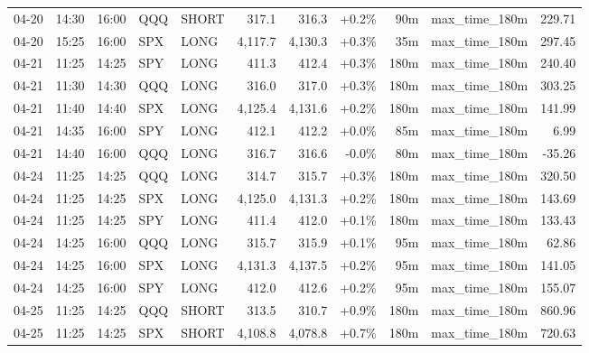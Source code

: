 \documentclass[11pt,a4paper,twoside]{article}
\begin{document}
\begin{center}
\begin{longtable}{>{\color{txtmain}}l l l l l r r r r >{\color{txtmain}}l r}
04-20 & 14:30 & 16:00 & QQQ & SHORT & 317.1 & 316.3 & \textcolor{wingreen}{+0.2\%} & 90m & max\_time\_180m & \textcolor{wingreen}{229.71} \\
04-20 & 15:25 & 16:00 & SPX & LONG & 4,117.7 & 4,130.3 & \textcolor{wingreen}{+0.3\%} & 35m & max\_time\_180m & \textcolor{wingreen}{297.45} \\
04-21 & 11:25 & 14:25 & SPY & LONG & 411.3 & 412.4 & \textcolor{wingreen}{+0.3\%} & 180m & max\_time\_180m & \textcolor{wingreen}{240.40} \\
04-21 & 11:30 & 14:30 & QQQ & LONG & 316.0 & 317.0 & \textcolor{wingreen}{+0.3\%} & 180m & max\_time\_180m & \textcolor{wingreen}{303.25} \\
04-21 & 11:40 & 14:40 & SPX & LONG & 4,125.4 & 4,131.6 & \textcolor{wingreen}{+0.2\%} & 180m & max\_time\_180m & \textcolor{wingreen}{141.99} \\
04-21 & 14:35 & 16:00 & SPY & LONG & 412.1 & 412.2 & \textcolor{wingreen}{+0.0\%} & 85m & max\_time\_180m & \textcolor{wingreen}{6.99} \\
04-21 & 14:40 & 16:00 & QQQ & LONG & 316.7 & 316.6 & \textcolor{lossred}{-0.0\%} & 80m & max\_time\_180m & \textcolor{lossred}{-35.26} \\
04-24 & 11:25 & 14:25 & QQQ & LONG & 314.7 & 315.7 & \textcolor{wingreen}{+0.3\%} & 180m & max\_time\_180m & \textcolor{wingreen}{320.50} \\
04-24 & 11:25 & 14:25 & SPX & LONG & 4,125.0 & 4,131.3 & \textcolor{wingreen}{+0.2\%} & 180m & max\_time\_180m & \textcolor{wingreen}{143.69} \\
04-24 & 11:25 & 14:25 & SPY & LONG & 411.4 & 412.0 & \textcolor{wingreen}{+0.1\%} & 180m & max\_time\_180m & \textcolor{wingreen}{133.43} \\
04-24 & 14:25 & 16:00 & QQQ & LONG & 315.7 & 315.9 & \textcolor{wingreen}{+0.1\%} & 95m & max\_time\_180m & \textcolor{wingreen}{62.86} \\
04-24 & 14:25 & 16:00 & SPX & LONG & 4,131.3 & 4,137.5 & \textcolor{wingreen}{+0.2\%} & 95m & max\_time\_180m & \textcolor{wingreen}{141.05} \\
04-24 & 14:25 & 16:00 & SPY & LONG & 412.0 & 412.6 & \textcolor{wingreen}{+0.2\%} & 95m & max\_time\_180m & \textcolor{wingreen}{155.07} \\
04-25 & 11:25 & 14:25 & QQQ & SHORT & 313.5 & 310.7 & \textcolor{wingreen}{+0.9\%} & 180m & max\_time\_180m & \textcolor{wingreen}{860.96} \\
04-25 & 11:25 & 14:25 & SPX & SHORT & 4,108.8 & 4,078.8 & \textcolor{wingreen}{+0.7\%} & 180m & max\_time\_180m & \textcolor{wingreen}{720.63} \\

\end{longtable}
\end{center}
\end{document}
